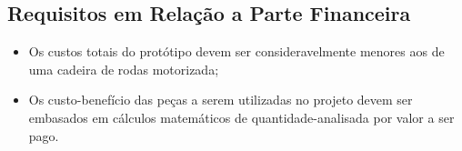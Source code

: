\subsection{Requisitos em Relação a Parte Financeira}
  \begin{itemize}
    \item Os custos totais do protótipo devem ser consideravelmente menores aos de uma cadeira de rodas motorizada;
    \item Os custo-benefício das peças a serem utilizadas no projeto devem ser embasados em cálculos matemáticos de quantidade-analisada por valor a ser pago.
  \end{itemize}
